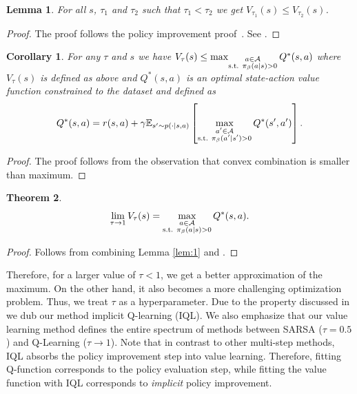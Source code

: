 \documentclass{article} %
\newtheorem{theorem}{Theorem}
\newtheorem{lemma}[theorem]{Lemma}
\newtheorem{corollary}{Corollary}[theorem]
\def\ourname{IQL\xspace}
\begin{document}
\begin{lemma}
\label{lem:2}
For all $s$, $\tau_1$ and $\tau_2$ such that $\tau_1 < \tau_2$ we get
$V_{\tau_1}(s) \le V_{\tau_2} (s)$.
\end{lemma}
\begin{proof}
The proof follows the policy improvement proof~\citep{sutton2018reinforcement}. See .
\end{proof}

\label{sec:iql}
\begin{corollary}
For any $\tau$ and $s$ we have
$
V_\tau(s)\le\max_{\substack{a\in \mathcal{A} \\\text{s.t. }\pi_\beta(a|s) > 0}}Q^*(s,a)
$
where $V_\tau(s)$ is defined as above and $Q^*(s,a)$ is an optimal state-action value function constrained to the dataset and defined as
\vspace{-0.4cm}
$$
Q^*(s, a) = r(s,a) + \gamma \mathbb{E}_{s'\sim p(\cdot|s,a)}\left[\max_{\substack{a'\in \mathcal{A} \\\text{s.t. }\pi_\beta(a'|s') > 0}}Q^*(s',a')\right].
$$
\vspace{-0.5cm}
\label{theorem:cor}
\end{corollary}
\vspace{-0.2cm}
\begin{proof}
The proof follows from the observation that convex combination is smaller than maximum.
\end{proof}
\begin{theorem}
\label{theorem:iql}
$$
\lim_{\tau \rightarrow 1} V_\tau(s) = \max_{\substack{a\in \mathcal{A} \\\text{s.t. }\pi_\beta(a|s) > 0}}Q^*(s,a).
$$
\vspace{-0.5cm}
\end{theorem}
\begin{proof}
Follows from combining Lemma \ref{lem:1} and  .
\end{proof}
Therefore, for a larger value of $\tau < 1$, we get a better approximation of the maximum. On the other hand, it also becomes a more challenging optimization problem. Thus, we treat $\tau$ as a hyperparameter.
Due to the property discussed in  we dub our method implicit Q-learning (\ourname). We also emphasize that our value learning method defines the entire spectrum of methods between SARSA ($\tau=0.5$) and Q-Learning ($\tau \rightarrow 1$). Note that in contrast to other multi-step methods, IQL absorbs the policy improvement step into value learning. Therefore, fitting Q-function corresponds to the policy evaluation step, while fitting the value function with IQL corresponds to \textit{implicit} policy improvement.
\end{document}
